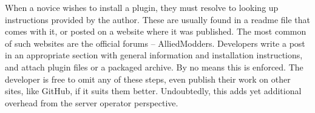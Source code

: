 When a novice wishes to install a plugin, they must resolve to looking up instructions provided by the author.
These are usually found in a readme file that comes with it, or posted on a website where it was published.
The most common of such websites are the official forums -- AlliedModders.
Developers write a post in an appropriate section with general information and installation instructions, and attach plugin files or a packaged archive.
By no means this is enforced.
The developer is free to omit any of these steps, even publish their work on other sites, like GitHub, if it suits them better.
Undoubtedly, this adds yet additional overhead from the server operator perspective.

